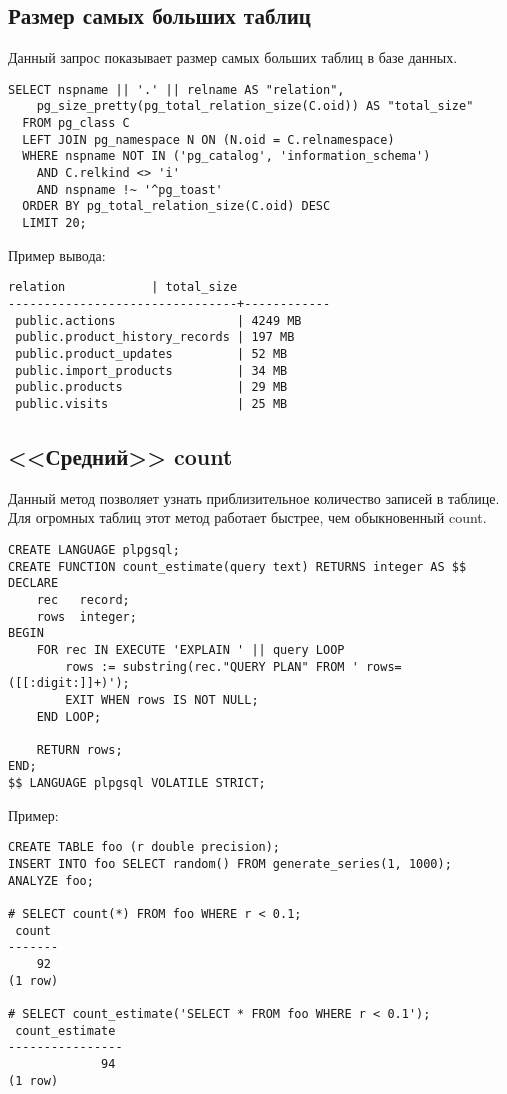 \subsection{Размер самых больших таблиц}
Данный запрос показывает размер самых больших таблиц в базе данных.

\begin{lstlisting}[label=lst:snippets3,title=snippets/biggest\_tables.sql]
SELECT nspname || '.' || relname AS "relation",
    pg_size_pretty(pg_total_relation_size(C.oid)) AS "total_size"
  FROM pg_class C
  LEFT JOIN pg_namespace N ON (N.oid = C.relnamespace)
  WHERE nspname NOT IN ('pg_catalog', 'information_schema')
    AND C.relkind <> 'i'
    AND nspname !~ '^pg_toast'
  ORDER BY pg_total_relation_size(C.oid) DESC
  LIMIT 20;
\end{lstlisting}

Пример вывода:
\begin{lstlisting}[label=lst:snippets4,caption=Размер самых больших таблиц. Пример вывода]
            relation            | total_size
--------------------------------+------------
 public.actions                 | 4249 MB
 public.product_history_records | 197 MB
 public.product_updates         | 52 MB
 public.import_products         | 34 MB
 public.products                | 29 MB
 public.visits                  | 25 MB
\end{lstlisting}

\subsection{<<Средний>> count}
Данный метод позволяет узнать приблизительное количество записей в таблице.
Для огромных таблиц этот метод работает быстрее, чем обыкновенный count.

\begin{lstlisting}[label=lst:snippets5,title=snippets/count\_estimate.sql]
CREATE LANGUAGE plpgsql;
CREATE FUNCTION count_estimate(query text) RETURNS integer AS $$
DECLARE
    rec   record;
    rows  integer;
BEGIN
    FOR rec IN EXECUTE 'EXPLAIN ' || query LOOP
        rows := substring(rec."QUERY PLAN" FROM ' rows=([[:digit:]]+)');
        EXIT WHEN rows IS NOT NULL;
    END LOOP;

    RETURN rows;
END;
$$ LANGUAGE plpgsql VOLATILE STRICT;
\end{lstlisting}

Пример:
\begin{lstlisting}[label=lst:snippets51,caption=<<Средний>> count. Пример]
CREATE TABLE foo (r double precision);
INSERT INTO foo SELECT random() FROM generate_series(1, 1000);
ANALYZE foo;

# SELECT count(*) FROM foo WHERE r < 0.1;
 count
-------
    92
(1 row)

# SELECT count_estimate('SELECT * FROM foo WHERE r < 0.1');
 count_estimate
----------------
             94
(1 row)
\end{lstlisting}

